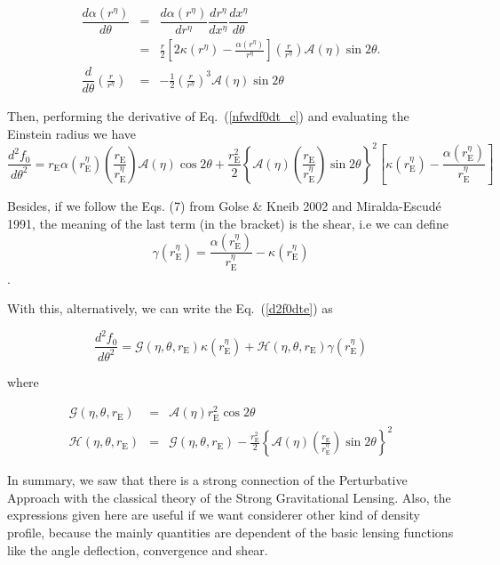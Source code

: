 \documentclass[a4paper,twoside]{article}
\def \ma {\mathcal{A}}
\def \re {r_{\mathrm{E}}}
\def \al {\alpha}
\def \te {\theta}
\def \xe {x^\eta}
\def \ree {r^\eta_{\mathrm{E}}}
\begin{document}
\begin{eqnarray}
\dfrac{d\al(r^\eta)}{d\te}&=&\dfrac{d\al(r^\eta)}{dr^\eta}\dfrac{dr^\eta}{d\xe}\dfrac{d\xe}{d\te} \nonumber \\
                          &=&\frac{r}{2}\left[ 2\kappa(r^\eta)-\frac{\al(r^\eta)}{r^\eta}\right]\left( \frac{r}{r^\eta} \right)\ma(\eta)\sin{2\te}.\\
\dfrac{d}{d\te}\left( \frac{r}{r^\eta} \right)&=&-\frac{1}{2}\left( \frac{r}{r^\eta} \right)^3\ma(\eta)\sin{2\te}
\end{eqnarray}

Then, performing the derivative of Eq.~(\ref{nfwdf0dt_c}) and evaluating the Einstein radius we have
\begin{equation}
\dfrac{d^2 f_0}{d\te^2}=\re\al(\ree)\left( \frac{\re}{\ree} \right)\ma(\eta)\cos{2\te}+%
\frac{\re^2}{2}\left\{\ma(\eta)\left(\frac{\re}{\ree}\right) \sin{2\te}  \right\}^2\left[\kappa(\ree)-\dfrac{\al(\ree)}{\ree}\right]
\label{d2f0dte}
\end{equation}


Besides, if we follow the Eqs. (7) from Golse \& Kneib 2002 and Miralda-Escud\'e 1991, the meaning of the last term (in the bracket) is the shear, 
i.e we can define
\begin{equation}\gamma(\ree)=\dfrac{\al(\ree)}{\ree}-\kappa(\ree)\end{equation}.

With this, alternatively, we can write the Eq.~(\ref{d2f0dte}) as

\begin{equation}
\dfrac{d^2 f_0}{d\te^2}=\mathcal{G}(\eta,\te,\re)\kappa(\ree)+\mathcal{H}(\eta,\te,\re)\gamma(\ree)
\end{equation}

where

\begin{eqnarray}
\mathcal{G}(\eta,\te,\re)&=& \ma(\eta)\re^2\cos{2\te}\\
\mathcal{H}(\eta,\te,\re)&=& \mathcal{G}(\eta,\te,\re)-\frac{\re^2}{2}\left\{\ma(\eta)\left(\frac{\re}{\ree}\right) \sin{2\te}  \right\}^2
\end{eqnarray}

In summary, we saw that there is a strong connection of the Perturbative Approach with the classical theory of the Strong Gravitational Lensing. Also,
the expressions given here are useful if we want considerer other kind of density profile, because the mainly quantities are dependent of the basic lensing functions like the angle deflection, convergence and shear.
\end{document}
